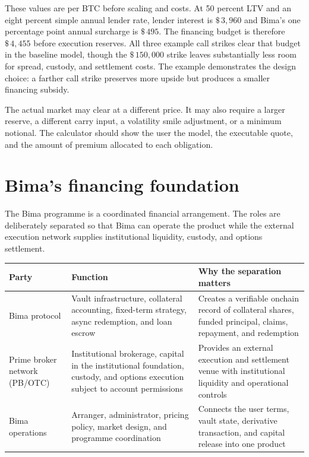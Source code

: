 \documentclass[11pt,oneside]{article}
\newcommand{\dollar}[1]{\$\,#1}
\begin{document}
These values are per BTC before scaling and costs. At 50 percent LTV and an eight percent simple annual lender rate, lender interest is $\dollar{3{,}960}$ and Bima's one percentage point annual surcharge is $\dollar{495}$. The financing budget is therefore $\dollar{4{,}455}$ before execution reserves. All three example call strikes clear that budget in the baseline model, though the $\dollar{150{,}000}$ strike leaves substantially less room for spread, custody, and settlement costs. The example demonstrates the design choice: a farther call strike preserves more upside but produces a smaller financing subsidy.

The actual market may clear at a different price. It may also require a larger reserve, a different carry input, a volatility smile adjustment, or a minimum notional. The calculator should show the user the model, the executable quote, and the amount of premium allocated to each obligation.

\section{Bima's financing foundation}

The Bima programme is a coordinated financial arrangement. The roles
are deliberately separated so that Bima can operate the product while the
external execution network supplies institutional liquidity, custody, and
options settlement.

\begin{center}
\begin{tabularx}{\textwidth}{@{}p{}YY@{}}
\toprule
\textbf{Party} & \textbf{Function} & \textbf{Why the separation matters} \\
\midrule
Bima protocol & Vault infrastructure, collateral accounting, fixed-term strategy, async redemption, and loan escrow & Creates a verifiable onchain record of collateral shares, funded principal, claims, repayment, and redemption \\
Prime broker network (PB/OTC) & Institutional brokerage, capital in the institutional foundation, custody, and options execution subject to account permissions & Provides an external execution and settlement venue with institutional liquidity and operational controls \\
Bima operations & Arranger, administrator, pricing policy, market design, and programme coordination & Connects the user terms, vault state, derivative transaction, and capital release into one product \\
\bottomrule
\end{tabularx}
\end{center}
\end{document}

